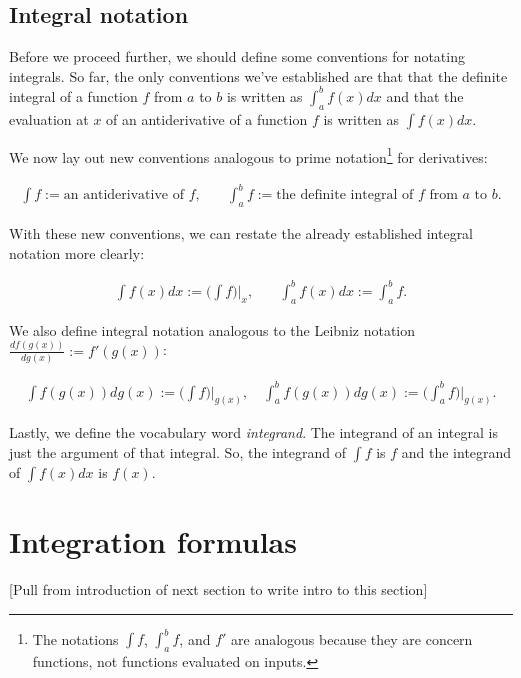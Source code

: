 \subsection*{Integral notation}

Before we proceed further, we should define some conventions for notating integrals. So far, the only conventions we've established are that that the definite integral of a function $f$ from $a$ to $b$ is written as $\int_a^b f(x) dx$ and that the evaluation at $x$ of an antiderivative of a function $f$ is written as $\int f(x) dx$. 

We now lay out new conventions analogous to prime notation\footnote{The notations $\int f$, $\int_a^b f$, and $f'$ are analogous because they are concern functions, not functions evaluated on inputs.} for derivatives:

\begin{align*}
    \int f := \text{an antiderivative of $f$}, &\quad \int_a^b f := \text{the definite integral of $f$ from $a$ to $b$}.
\end{align*}

With these new conventions, we can restate the already established integral notation more clearly:

\begin{align*}
    \int f(x) dx := \Big(\int f\Big)\Big|_x, &\quad \int_a^b f(x) dx := \int_a^b f.
\end{align*}

We also define integral notation analogous to the Leibniz notation $\frac{df(g(x))}{dg(x)} := f'(g(x))$:

\begin{align*}
    \int f(g(x)) dg(x) := \Big(\int f\Big)\Big|_{g(x)}, \quad \int_a^b f(g(x)) dg(x) := \Big(\int_a^b f\Big)\Big|_{g(x)}.
\end{align*}

\vspace{.5cm}

Lastly, we define the vocabulary word \textit{integrand}. The integrand of an integral is just the argument of that integral. So, the integrand of $\int f$ is $f$ and the integrand of $\int f(x) dx$ is $f(x)$.

\section*{Integration formulas}

[Pull from introduction of next section to write intro to this section]

